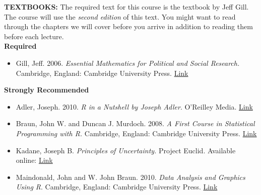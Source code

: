 \documentclass[12pt,a4paper]{article}
\begin{document}
\textbf{TEXTBOOKS:} The required text for this course is the textbook by Jeff Gill. The course will use the \textit{second edition} of this text. You might want to read through the chapters we will cover before you arrive in addition to reading them before each lecture.\\

\textbf{Required}
\begin{itemize}
\item Gill, Jeff. 2006. \textit{Essential Mathematics for Political and Social Research.} Cambridge, England: Cambridge University Press. \href{http://www.amazon.com/Essential-Mathematics-Political-Research-Analytical/dp/052168403X/ref=sr_1_1?ie=UTF8&qid=1304604787&sr=8-1}{Link}
\end{itemize}

\textbf{Strongly Recommended}
\begin{itemize}
\item Adler, Joseph. 2010. \textit{R in a Nutshell by Joseph Adler}. O'Reilley Media. \href{http://www.amazon.com/R-Nutshell-Joseph-Adler/dp/059680170X/ref=sr_1_1?ie=UTF8&qid=1305656181&sr=8-1-spell}{Link}

\item Braun, John W. and Duncan J. Murdoch. 2008. \textit{A First Course in Statistical Programming with R.} Cambridge, England: Cambridge University Press. \href{http://www.amazon.com/First-Course-Statistical-Programming/dp/0521694248/ref=sr_1_1?ie=UTF8&s=books&qid=1304605045&sr=8-1}{Link}

\item Kadane, Joseph B.  \textit{Principles of Uncertainty.} Project Euclid. Available online: \href{http://uncertainty.stat.cmu.edu/}{Link}

\item Maindonald, John and W. John Braun. 2010. \textit{Data Analysis and Graphics Using R}. Cambridge, England: Cambridge University Press. \href{http://www.amazon.com/Data-Analysis-Graphics-Using-Example-Based/dp/0521762936/ref=sr_1_1?ie=UTF8&s=books&qid=1305656286&sr=1-1}{Link}



\end{itemize}
\end{document}
